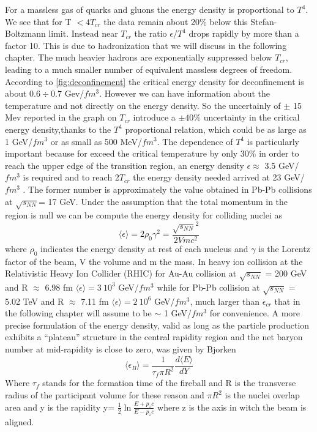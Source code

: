 \documentclass[12pt,a4paper]{book}
\begin{document}
	For a massless gas of quarks and gluons the energy density is proportional to $T^4$.  We see that for T $ <4T_{cr}$ the data remain about 20\% below this Stefan-Boltzmann limit. Instead near $T_{cr}$ the ratio $\epsilon$/$T^4$ drops rapidly by more than a factor 10. This is due to hadronization that we will discuss in the following chapter. The much heavier hadrons are exponentially suppressed below $T_{cr}$, leading to a much smaller number of equivalent massless degrees of freedom. According to \ref{fig:deconfinement} the critical energy density for deconfinement is about $0.6 \div 0.7$ Gev/$fm^3$. However we can have information about the temperature and not directly on the energy density. So the uncertainly of $\pm$ 15 Mev reported in the graph on $T_{cr}$ introduce a $\pm 40 \%$ uncertainty in the critical energy density,thanks to the $T^4$ proportional relation, which could be as large as 1 GeV/$fm^3$ or as small as 500 MeV/$fm^3$. The dependence of $T^4$ is particularly important because for exceed the critical temperature by only 30\% in order to reach the upper edge of the transition region, an energy density $\epsilon \approx$  3.5 GeV/$fm^3$ is required and to reach 2$T_{cr}$ the energy density needed arrived at 23 GeV/$fm^3$ \cite{heinz2004conceptsheavyionphysics}. The former number is approximately the value obtained in Pb-Pb collisions at $\sqrt{s_{NN}}$= 17 GeV. Under the assumption that the total momentum in the region is null we can be compute the energy density for colliding nuclei as
	\begin{equation}
		\langle \epsilon \rangle = 2 \rho_0 \gamma^2 = \frac{\sqrt{s_{NN}}^2}{2 V mc^2}
	\end{equation} 
	where $\rho_0$  indicates the energy density at rest of each nucleus and $\gamma$ is the Lorentz factor of the beam, V the volume and m the mass. In heavy ion collision at the Relativistic Heavy Ion Collider (RHIC) for Au-Au collision at $\sqrt{s_{NN}}$ = 200 GeV and R $\approx$ 6.98 fm $\langle \epsilon \rangle = 3 \  10^3$ GeV/$fm^3$ while for Pb-Pb collision at $\sqrt{s_{NN}}$ = 5.02 TeV and R $\approx$ 7.11 fm $\langle \epsilon \rangle = 2 \  10^6$ GeV/$fm^3$, much larger than $\epsilon_{cr}$ that in the following chapter will assume to be $\sim$ 1 GeV/$fm^3$ for convenience. A more precise formulation of the energy density, valid as long as the particle production exhibits a “plateau” structure in the central rapidity region and the net baryon number at mid-rapidity is close to zero, was given by Bjorken \cite{PhysRevD.27.140}
	\begin{equation}
		\langle \epsilon_B \rangle = \frac{1}{\tau_f \pi R^2} \frac{d \langle E \rangle}{dY}
	\end{equation}
	Where $\tau_f$ stands for the formation time of the fireball and R is the transverse radius of the participant volume for these reason and $\pi R^2$ is the nuclei overlap area and y is the rapidity y= $\frac{1}{2} \ln \frac{E+ p_z c} {E - p_z c}$ where z is the axis in witch the beam is aligned. \cite{amsdottorato9036}
	
\end{document}
